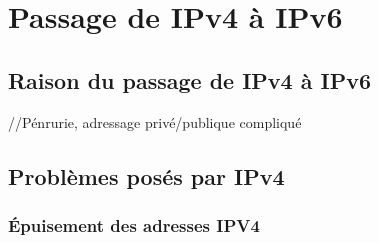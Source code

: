 \section{Passage de IPv4 à IPv6}

\subsection{Raison du passage de IPv4 à IPv6}


//Pénrurie, adressage privé/publique compliqué

\subsection{Problèmes posés par IPv4}

\subsubsection{Épuisement des adresses IPV4}

